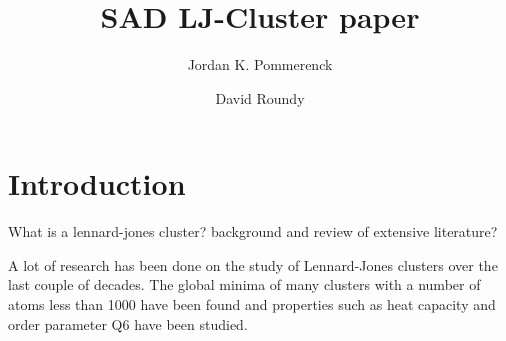 \documentclass[letterpaper,twocolumn,amsmath,amssymb,pre,aps,10pt]{revtex4-1}
\begin{document}
\title{SAD LJ-Cluster paper
}

\author{Jordan K. Pommerenck} \author{David Roundy}

\begin{abstract}
\end{abstract}

\maketitle

\section{Introduction}
%
%

What is a lennard-jones cluster? background and review of extensive literature?

A lot of research has been done on the study of Lennard-Jones clusters over the last couple
of decades. The global minima of many clusters with a number of atoms less than 1000 have been
found and properties such as heat capacity and order parameter Q6 have been studied.
\end{document}
